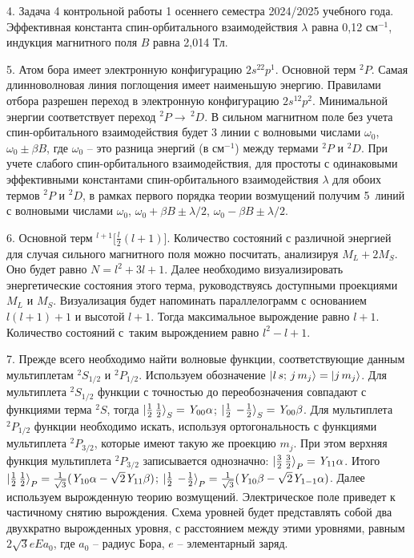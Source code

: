 4. Задача 4 контрольной работы 1 осеннего семестра 2024/2025 учебного года. Эффективная константа спин-орбитального взаимодействия $\lambda$ равна 0,12 см$^{-1}$, индукция магнитного поля $B$ равна 2,014 Тл.\par
5. Атом бора имеет электронную конфигурацию $2s^22p^1$. Основной терм $^2P$. Самая длинноволновая линия поглощения имеет наименьшую энергию. Правилами отбора разрешен переход в электронную конфигурацию $2s^12p^2$. Минимальной энергии соответствует переход $^2P \rightarrow\,^2D$. В сильном магнитном поле без учета спин-орбитального взаимодействия будет 3 линии с волновыми числами $\omega_{0}$, $\omega_{0} \pm \beta B$, где $\omega_{0}$ – это разница энергий (в см$^{-1}$) между термами $^2P$ и $^2D$. При учете слабого спин-орбитального взаимодействия, для простоты с одинаковыми эффективными константами спин-орбитального взаимодействия $\lambda$ для обоих термов $^2P$ и $^2D$, в рамках первого порядка теории возмущений получим 5~линий с волновыми числами $\omega_{0}$, $\omega_{0} + \beta B \pm \lambda/2$, $\omega_{0} - \beta B \pm \lambda/2$.\par
6. Основной терм $^{l+1} \Big[ \frac l2 (l+1) \Big]$. Количество состояний с различной энергией для случая сильного магнитного поля можно посчитать, анализируя $M_L+2M_S$. Оно будет равно $N=l^2+3l+1$. Далее необходимо визуализировать энергетические состояния этого терма, руководствуясь доступными проекциями $M_L$ и $M_S$. Визуализация будет напоминать параллелограмм с основанием $l(l+1)+1$ и высотой $l+1$. Тогда максимальное вырождение равно $l+1$. Количество состояний с~таким вырождением равно $l^2-l+1$.\par
7. Прежде всего необходимо найти волновые функции, соответствующие данным мультиплетам $^2S_{1/2}$ и $^2P_{1/2}$. Используем обозначение $\ket{l\, s;\, j \, m_j} = \ket{j\,m_j}$. Для мультиплета $^2S_{1/2}$ функции с точностью до переобозначения совпадают с функциями терма $^2S$, тогда $\ket{ \frac12 \,  \frac12}_S = \textit{Y}_{00}\alpha$; $\ket{ \frac12\,-\!\frac{1}{2}}_S = \textit{Y}_{00}\beta$. Для мультиплета $^2P_{1/2}$ функции необходимо искать, используя ортогональность с функциями мультиплета $^2P_{3/2}$, которые имеют такую же проекцию $m_j$. При этом верхняя функция мультиплета $^2P_{3/2}$ записывается однозначно: $\ket{ \frac32 \,  \frac32}_P = \textit{Y}_{11}\alpha$. Итого 
$\ket{ \frac12 \,  \frac12}_P = \frac{1}{\sqrt3}(\textit{Y}_{10}\alpha - \sqrt2 \textit{Y}_{11} \beta) $; $\ket{ \frac12\,-\!\frac{1}{2}}_P =  \frac{1}{\sqrt3}(\textit{Y}_{10}\beta - \sqrt2 \textit{Y}_{1-1} \alpha)$. Далее используем вырожденную теорию возмущений. Электрическое поле приведет к частичному снятию вырождения. Схема уровней будет представлять собой два двухкратно вырожденных уровня, с расстоянием между этими уровнями, равным $2\sqrt3 eEa_0$, где $a_0$ – радиус Бора, $e$ – элементарный заряд.\par
